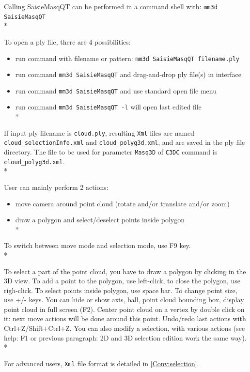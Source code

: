 Calling SaisieMasqQT can be performed in a command shell with: {\tt mm3d SaisieMasqQT}\\*

To open a ply file, there are 4 possibilities:
\begin{itemize}
\item run command with filename or pattern: {\tt mm3d SaisieMasqQT filename.ply}
\item run command {\tt mm3d SaisieMasqQT} and drag-and-drop ply file(s) in interface
\item run command {\tt mm3d SaisieMasqQT} and use standard open file menu
\item run command {\tt mm3d SaisieMasqQT -l} will open last edited file\\*
\end{itemize}

If input ply filename is {\tt cloud.ply}, resulting {\tt Xml} files are named {\tt cloud\_selectionInfo.xml} and {\tt cloud\_polyg3d.xml}, and are saved in the ply file directory.
The file to be used for parameter {\tt Masq3D} of {\tt C3DC} command is {\tt cloud\_polyg3d.xml}.\\*

User can mainly perform 2 actions:
\begin{itemize}
\item move camera around point cloud (rotate and/or translate and/or zoom)
\item draw a polygon and select/deselect points inside polygon\\*
\end{itemize}

To switch between move mode and selection mode, use F9 key.\\*

To select a part of the point cloud, you have to draw a polygon by clicking in the 3D view. To add a point to the polygon, use left-click, to close the polygon, use righ-click. To select points inside polygon, use space bar.
To change point size, use +/- keys. You can hide or show axis, ball, point cloud bounding box, display point cloud in full screen (F2).
Center point cloud on a vertex by double click on it: next move actions will be done around this point.
Undo/redo last actions with Ctrl+Z/Shift+Ctrl+Z.
You can also modify a selection, with various actions (see help: F1 or previous paragraph: 2D and 3D selection edition work the same way).\\*

For advanced users, {\tt Xml} file format is detailed in \ref{Conv:selection}.

